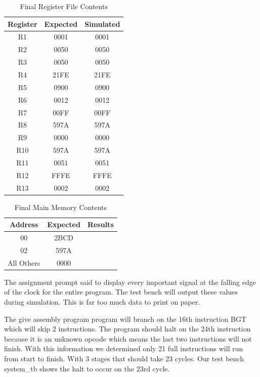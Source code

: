 	\begin{table}[htbp]
		   \caption{Final Register File Contents}
		   \label{results}
		   \centering
		   \begin{tabular}{ c | c | c}
		   Register         & Expected & Simulated   \\
		   \hline
		   R1  &   0001     &   0001        \\
	       R2  &   0050     &   0050        \\
	       R3  &   0050     &   0050        \\
	       R4  &   21FE     &   21FE        \\
	       R5  &   0900     &   0900        \\
	       R6  &   0012     &   0012        \\
	       R7  &   00FF     &   00FF        \\
	       R8  &   597A     &   597A        \\
	       R9  &   0000     &   0000        \\
	       R10 &   597A     &   597A        \\
	       R11 &   0051     &   0051        \\
	       R12 &   FFFE     &   FFFE        \\
	       R13 &   0002     &   0002        \\
		   \end{tabular}
		\end{table}
	    \begin{table}[htbp]
	       \caption{Final Main Memory Contents}
	       \label{fmainme}
	       \centering
	       \begin{tabular}{ c | c | c }
	       Address         & Expected & Results    \\
	       \hline
	       00  &   2BCD            \\
           02  &   597A            \\
	       All Others  &   0000    \\
	       
	       \end{tabular}
	    \end{table}
	    The assignment prompt said to display every important signal at the falling
	    edge of the clock for the entire program. The test bench will output these values
	    during simulation. This is far too much data to print on paper.
	     
	    The give assembly program program will branch on the 16th instruction BGT which will skip 2 instructions. The program should halt on the 24th instruction because it is an unknown
	    opcode which means the last two instructions will not finish.
	    With this information we determined only 21 full instructions will run from start to finish. With 3 stages that should take 23 cycles.
	    Our test bench system\_tb shows the halt to occur on the 23rd cycle. 
\onecolumn
